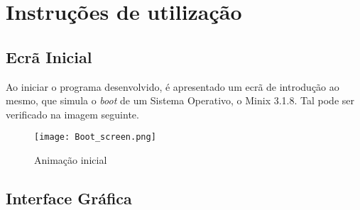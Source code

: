 \documentclass[a4paper]{article}
\begin{document}
%
%
%
%
%
%
%

\tableofcontents{}

\newpage
\section{Instruções de utilização}

\subsection{Ecrã Inicial}

	Ao iniciar o programa desenvolvido, é apresentado um ecrã de introdução ao mesmo, que simula o \textit{boot} de um Sistema Operativo, o Minix 3.1.8. Tal pode ser verificado na imagem seguinte.

\begin{figure}[h]
\centering
\texttt{[image: Boot\_screen.png]}
\caption{Animação inicial}
\end{figure}


\subsection{Interface Gráfica}
\end{document}
